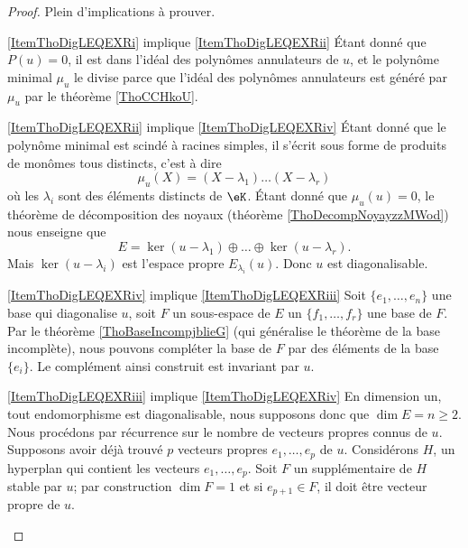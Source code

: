 \begin{proof}
    Plein d'implications à prouver.
    \begin{subproof}
    \item[\ref{ItemThoDigLEQEXRi} implique \ref{ItemThoDigLEQEXRii}] Étant donné que \( P(u)=0\), il est dans l'idéal des polynômes annulateurs de \( u\), et le polynôme minimal \( \mu_u\) le divise parce que l'idéal des polynômes annulateurs est généré par \( \mu_u\) par le théorème \ref{ThoCCHkoU}.

    \item[\ref{ItemThoDigLEQEXRii} implique \ref{ItemThoDigLEQEXRiv}] Étant donné que le polynôme minimal est scindé à racines simples, il s'écrit sous forme de produits de monômes tous distincts, c'est à dire
    \begin{equation}
        \mu_u(X)=(X-\lambda_1)\ldots(X-\lambda_r)
    \end{equation}
    où les \( \lambda_i\) sont des éléments distincts de \( \eK\). Étant donné que \( \mu_u(u)=0\), le théorème de décomposition des noyaux (théorème \ref{ThoDecompNoyayzzMWod}) nous enseigne que
    \begin{equation}
        E=\ker(u-\lambda_1)\oplus\ldots\oplus\ker(u-\lambda_r).
    \end{equation}
    Mais \( \ker(u-\lambda_i)\) est l'espace propre \( E_{\lambda_i}(u)\). Donc \( u\) est diagonalisable.

\item[\ref{ItemThoDigLEQEXRiv} implique \ref{ItemThoDigLEQEXRiii}] Soit \( \{ e_1,\ldots, e_n \}\) une base qui diagonalise \( u\), soit \( F\) un sous-espace de \( E\) un \( \{ f_1,\ldots, f_r \}\) une base de \( F\). Par le théorème \ref{ThoBaseIncompjblieG} (qui généralise le théorème de la base incomplète), nous pouvons compléter la base de \( F\) par des éléments de la base \( \{ e_i \}\). Le complément ainsi construit est invariant par \( u\).

\item[\ref{ItemThoDigLEQEXRiii} implique \ref{ItemThoDigLEQEXRiv}] En dimension un, tout endomorphisme est diagonalisable, nous supposons donc que \( \dim E=n\geq 2\). Nous procédons par récurrence sur le nombre de vecteurs propres connus de \( u\). Supposons avoir déjà trouvé \( p\) vecteurs propres \( e_1,\ldots, e_p\) de \( u\). Considérons \( H\), un hyperplan qui contient les vecteurs \( e_1,\ldots, e_p\). Soit \( F\) un supplémentaire de \( H\) stable par \( u\); par construction \( \dim F=1\) et si \( e_{p+1}\in F\), il doit être vecteur propre de \( u\).


\end{subproof}
\end{proof}
